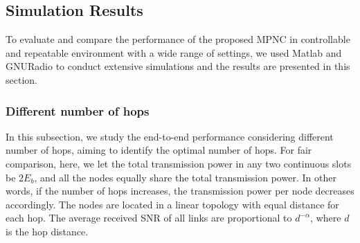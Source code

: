 
  





\subsection{Simulation Results}

To evaluate and compare the performance of the proposed MPNC in controllable and repeatable environment with a wide range of settings, we used Matlab and GNURadio to conduct extensive simulations and the results are presented in this section. 


\iffalse

\subsubsection{Different number of hops} %
\label{sub:awgn}
In this subsection, we study the end-to-end performance considering different number of hops, aiming to identify the optimal number of hops. 
For fair comparison, here, we let the total transmission power in any two continuous slots be $2E_b$, and all the nodes equally share the total transmission power. In other words, if the number of hops increases, the transmission power per node decreases accordingly. The nodes are located in a linear topology with equal distance for each hop.  The average received SNR of all links are proportional to $d^{-\alpha}$, where $d$ is the hop distance. %

